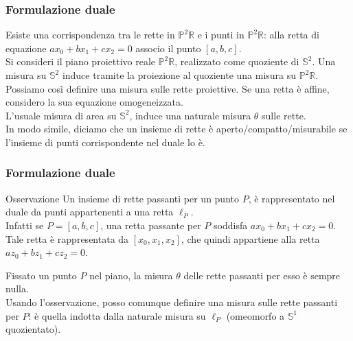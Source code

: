 \documentclass[11pt]{beamer} %
\newcommand{\R}{\mathbb{R}}
\renewcommand{\S}{\mathbb{S}}
\renewcommand{\P}{\mathbb{P}}
\newcommand{\<}{\langle}
\renewcommand{\>}{\rangle}
\theoremstyle{theorem}
\theoremstyle{theorem}
\theoremstyle{theorem}
\theoremstyle{theorem}
\theoremstyle{theorem}
\begin{document}


\begin{frame}
	\frametitle{Formulazione duale}
	Esiste una corrispondenza tra le rette in $\P^2 \R$ e i punti in $\P^2\R$: alla retta di equazione $ax_0+bx_1+cx_2=0$ associo il punto $[a,b,c]$.\\
	\pause
	Si consideri il piano proiettivo reale $\P^2 \R$, realizzato come quoziente di $\S^2$. Una misura su $\S^2$ induce tramite la proiezione al quoziente una misura su $\P^2\R$.\\
	\pause
	Possiamo così definire una misura sulle rette proiettive. Se una retta è affine, considero la sua equazione omogeneizzata.\\
	L'usuale misura di area su $\S^2$, induce una naturale misura $\theta$ sulle rette.\\
	\pause
	In modo simile, diciamo che un insieme di rette è aperto/compatto/misurabile se l'insieme di punti corrispondente nel duale lo è.

	
\end{frame}

\begin{frame}
	\frametitle{Formulazione duale}
	
	\begin{block}{Osservazione}
		Un insieme di rette passanti per un punto $P$, è rappresentato nel duale da punti appartenenti a una retta $\ell_P$.\\
		\pause
		Infatti se $P=[a,b,c]$, una retta passante per $P$ soddisfa $ax_0+bx_1+cx_2=0$. Tale retta è rappresentata da $[x_0,x_1,x_2]$, che quindi appartiene alla retta $az_0+bz_1+cz_2=0$.\\
	\end{block}
	\pause
	Fissato un punto $P$ nel piano, la misura $\theta$ delle rette passanti per esso è sempre nulla.\\
	\pause
	Usando l'osservazione, posso comunque definire una misura sulle rette passanti per $P$: è quella indotta dalla naturale misura su $\ell_P$ (omeomorfo a $\S^1$ quozientato).\\
\end{frame}	

	
\end{document}
